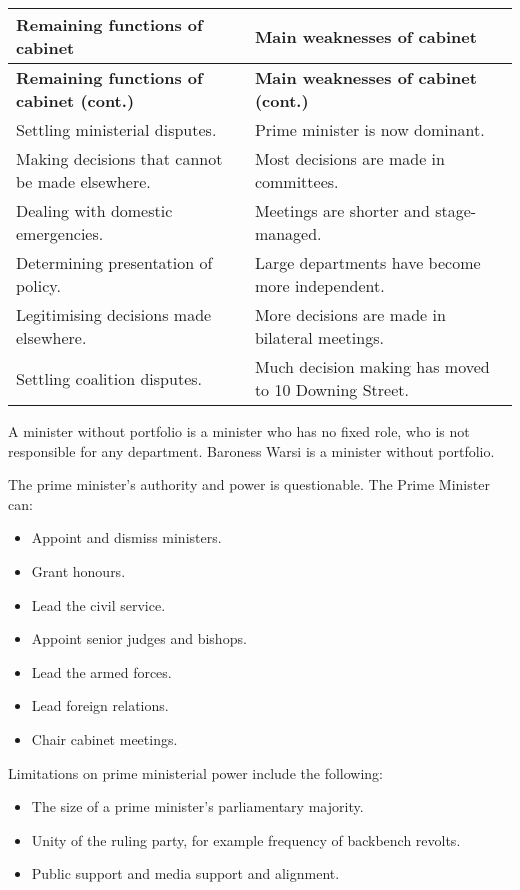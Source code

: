 \documentclass[11pt]{article}
\begin{document}
\begin{longtable}{| p{7cm} | p{7cm} |}
	\hline
	\textbf{Remaining functions of cabinet} & \textbf{Main weaknesses
of cabinet}\\
	\endfirsthead
	\hline
	\textbf{Remaining functions of cabinet (cont.)} & \textbf{Main weaknesses of
cabinet (cont.)}\\
	\endhead
	\hline
	Settling ministerial disputes. & Prime minister is now dominant.\\
	\hline
	Making decisions that cannot be made elsewhere. & Most decisions
are made in committees.\\
	\hline
	Dealing with domestic emergencies. & Meetings are shorter and
stage-managed.\\
	\hline
	Determining presentation of policy. & Large departments have become
more independent.\\
	\hline
	Legitimising decisions made elsewhere. & More decisions are made in
bilateral meetings.\\
	\hline
	Settling coalition disputes. & Much decision making has moved to 10
Downing Street.\\
	\hline
\end{longtable}

A minister without portfolio is a minister who has no fixed role, who is
not responsible for any department.  Baroness Warsi is a minister without
portfolio.

The prime minister's authority and power is questionable.  The Prime
Minister can:
	\begin{itemize}
		\item{Appoint and dismiss ministers.}
		\item{Grant honours.}
		\item{Lead the civil service.}
		\item{Appoint senior judges and bishops.}
		\item{Lead the armed forces.}
		\item{Lead foreign relations.}
		\item{Chair cabinet meetings.}
	\end{itemize}

Limitations on prime ministerial power include the following:

	\begin{itemize}
		\item{The size of a prime minister's parliamentary
majority.}
		\item{Unity of the ruling party, for example frequency of
backbench revolts.}
		\item{Public support and media support and alignment.}
	\end{itemize}
\end{document}
